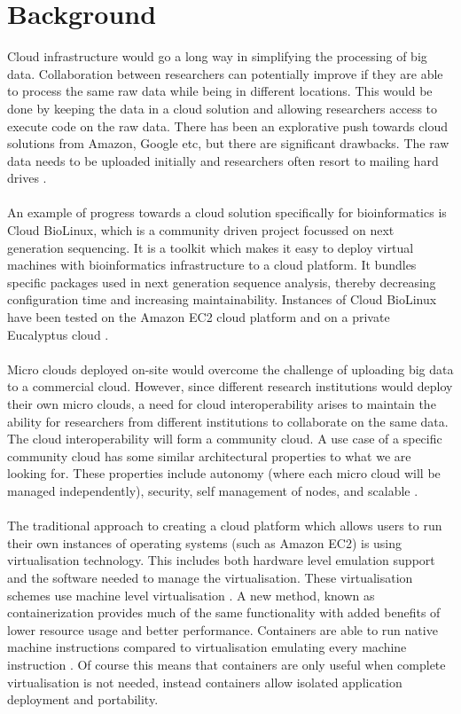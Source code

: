 \documentclass{sig-alternate-05-2015}
\begin{document}
\section{Background}
Cloud infrastructure would go a long way in simplifying the processing of big data. Collaboration between researchers can potentially improve if they are able to process the same raw data while being in different locations. This would be done by keeping the data in a cloud solution and allowing researchers access to execute code on the raw data. There has been an explorative push towards cloud solutions from Amazon, Google etc, but there are significant drawbacks. The raw data needs to be uploaded initially and researchers often resort to mailing hard drives \cite{baker2010next}. 
\\
\\
An example of progress towards a cloud solution specifically for bioinformatics is Cloud BioLinux, which is a community driven project focussed on next generation sequencing. It is a toolkit which makes it easy to deploy virtual machines with bioinformatics infrastructure to a cloud platform. It bundles specific packages used in next generation sequence analysis, thereby decreasing configuration time and increasing maintainability. Instances of Cloud BioLinux have been tested on the Amazon EC2 cloud platform and on a private Eucalyptus cloud \cite{krampis2012cloud}.
\\
\\
Micro clouds deployed on-site would overcome the challenge of uploading big data to a commercial cloud. However, since different research institutions would deploy their own micro clouds, a need for cloud interoperability arises to maintain the ability for researchers from different institutions to collaborate on the same data. The cloud interoperability will form a community cloud. A use case of a specific community cloud has some similar architectural properties to what we are looking for. These properties include autonomy (where each micro cloud will be managed independently), security, self management of nodes, and scalable \cite{jimenez2014deploying}.
\\
\\
The traditional approach to creating a cloud platform which allows users to run their own instances of operating systems (such as Amazon EC2) is using virtualisation technology. This includes both hardware level emulation support and the software needed to manage the virtualisation. These virtualisation schemes use machine level virtualisation \cite{fink2014docker}. A new method, known as containerization provides much of the same functionality with added benefits of lower resource usage and better performance. Containers are able to run native machine instructions compared to virtualisation emulating every machine instruction \cite{dua2014virtualization}. Of course this means that containers are only useful when complete virtualisation is not needed, instead containers allow isolated application deployment and portability.



 
\end{document}
